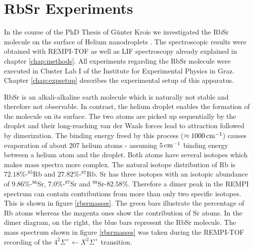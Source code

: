 \documentclass[parskip,12pt,headsepline,a4paper] {scrbook}
\begin{document}
\section{RbSr Experiments}
\vspace{-1\baselineskip}
In the course of the PhD Thesis of G\"unter Krois we investigated the RbSr molecule on the surface of Helium nanodroplets \cite{paperkrois}. The spectroscopic results were obtained with REMPI-TOF as well as LIF spectroscopy already explained in chapter \ref{chap:methods}. All experiments regarding the RbSr molecule were executed in Cluster Lab I of the Institute for Experimental Physics in Graz. Chapter \ref{chap:expsetup} describes the experimental setup of this apparatus.

RbSr is an alkali-alkaline earth molecule which is naturally not stable and therefore not observable. In contrast, the helium droplet enables the formation of the molecule on its surface. The two atoms are picked up sequentially by the droplet and their long-reaching van der Waals forces lead to attraction followed by dimerization. The binding energy freed by this process ($\approx \unit[1000]{cm^{-1}}$) causes evaporation of about 207 helium atoms - assuming $\unit[5]{cm^{-1}}$ binding energy between a helium atom and the droplet. Both atoms have several isotopes which makes mass spectra more complex. The natural isotope distribution of Rb is $72.18\%$-$^{85}$Rb and $27.82\%$-$^{87}$Rb. Sr has three isotopes with an isotopic abundance of $9.86\%$-$^{86}$Sr, $7.0\%$-$^{87}$Sr and $^{88}$Sr-$82.58\%$. Therefore a dimer peak in the REMPI spectrum can contain contributions from more than only two specific isotopes. This is shown in figure \ref{rbsrmasses}. The green bars illustrate the percentage of Rb atoms whereas the magenta ones show the contribution of Sr atoms. In the dimer diagram, on the right, the blue bars represent the RbSr molecule. The mass spectrum shown in figure \ref{rbsrmasses} was taken during the REMPI-TOF recording of the $4 ^2\Sigma^+ \leftarrow X ^2\Sigma^+$ transition.
\end{document}
